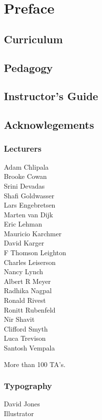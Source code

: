 \chapter*{Preface}


\section*{Curriculum}

\section*{Pedagogy}

\section*{Instructor's Guide}

\section*{Acknowlegements}

\subsection*{Lecturers}

Adam Chlipala\\
Brooke Cowan\\
Srini Devadas\\
Shafi Goldwasser\\
Lars Engebretsen\\
Marten van Dijk\\
Eric Lehman\\
Mauricio Karchmer\\
David Karger\\
F Thomson Leighton\\
Charles Leiserson\\
Nancy Lynch\\
Albert R Meyer\\
Radhika Nagpal\\
Ronald Rivest\\
Ronitt Rubenfeld\\
Nir Shavit\\
Clifford Smyth\\
Luca Trevison\\
Santosh Vempala

More than 100 TA's.

\subsection*{Typography}

David Jones\\
Illustrator

\endinput

